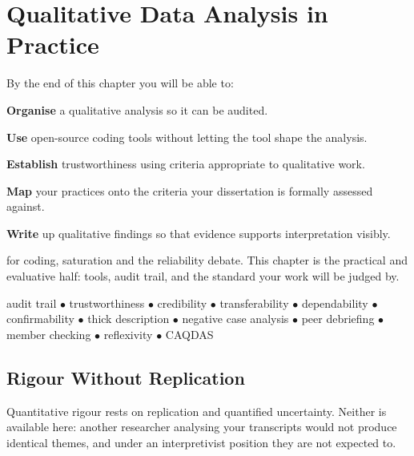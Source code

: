 \chapter{Qualitative Data Analysis in Practice}\label{ch:qda}

\begin{outcomes}
By the end of this chapter you will be able to:
\begin{tight}
  \item \textbf{Organise} a qualitative analysis so it can be audited.
  \item \textbf{Use} open-source coding tools without letting the tool shape
    the analysis.
  \item \textbf{Establish} trustworthiness using criteria appropriate to
    qualitative work.
  \item \textbf{Map} your practices onto the criteria your dissertation is
    formally assessed against.
  \item \textbf{Write} up qualitative findings so that evidence supports
    interpretation visibly.
\end{tight}
\end{outcomes}

\begin{prereq}
 for coding, saturation and the reliability debate. This
chapter is the practical and evaluative half: tools, audit trail, and the
standard your work will be judged by.
\end{prereq}

\begin{keyterms}
audit trail $\bullet$ trustworthiness $\bullet$ credibility $\bullet$
transferability $\bullet$ dependability $\bullet$ confirmability $\bullet$
thick description $\bullet$ negative case analysis $\bullet$ peer debriefing
$\bullet$ member checking $\bullet$ reflexivity $\bullet$ CAQDAS
\end{keyterms}

\section{Rigour Without Replication}

Quantitative rigour rests on replication and quantified uncertainty. Neither is
available here: another researcher analysing your transcripts would not produce
identical themes, and under an interpretivist position they are not expected to.

